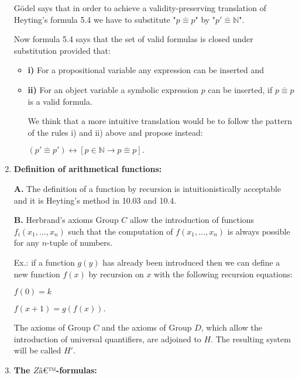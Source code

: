\documentclass[12pt]{article}
\begin{document}
\begin{enumerate}
G\"{o}del says that in order to achieve a validity-preserving translation of Heyting's formula 5.4 we have to substitute "$p \overline{\equiv} p$" by "$p' \overline{\equiv} \mathbb{N}$".

Now formula 5.4 says that the set of valid formulas is closed under substitution provided that:

\begin{itemize}

\item \textbf{i)} For a propositional variable any expression can be inserted and

\item \textbf{ii)} For an object variable a symbolic expression $p$ can be inserted, if  $p \overline{\equiv} p$ is a valid formula.

We think that a more intuitive translation would be to follow the pattern of the rules i) and ii) above and propose instead:

\begin{center}
$(p' \overline{\equiv} p') \leftrightarrow [p \in \mathbb{N} \rightarrow p \overline{\equiv} p].$
\end{center}
\end{itemize}

\item \textbf{Definition of arithmetical functions:}

\textbf{A.} The definition of a function by recursion is intuitionistically acceptable and it is Heyting's method in 10.03 and 10.4.

\textbf{B.} Herbrand's axioms Group $C$ allow the introduction of functions $f_i (x_1, \ldots, x_n)$ such that the computation of $f (x_1, \ldots, x_n)$ is always possible for any $n$-tuple of numbers. 

Ex.: if a function $g (y)$ has already been introduced then we can define a new function $f (x)$ by recursion on $x$ with the following recursion equations:

\begin{center}
$f (0) = k$ 

$f(x + 1) = g (f (x)).$
\end{center}

The axioms of Group $C$ and the axioms of Group $D$, which allow the introduction of universal quantifiers, are adjoined to $H$. The resulting system will be called $H'$.

\item \textbf{The $Zâ€™$-formulas:}


\end{enumerate}
\end{document}
